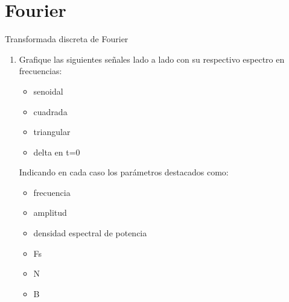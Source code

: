  \section{Fourier}
 \begin{frame}{Transformada discreta de Fourier}
    \begin{enumerate}
       \item{Grafique las siguientes señales lado a lado con su respectivo espectro en frecuencias:}
    \begin{itemize}
       \item{senoidal}
       \item{cuadrada}
       \item{triangular}
       \item{delta en t=0}
    \end{itemize}
 Indicando en cada caso los parámetros destacados como:
    \begin{itemize}
       \item{frecuencia}
       \item{amplitud}
       \item{densidad espectral de potencia}
       \item{Fs}
       \item{N}
       \item{B}
    \end{itemize}
    \end{enumerate}
    \vfill
 \end{frame}

